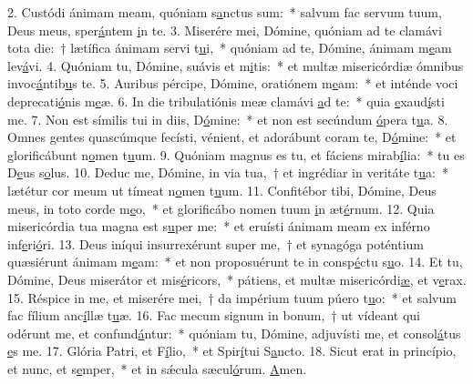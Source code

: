 2. Custódi ánimam meam, quóniam s\uline{a}nctus sum:~* salvum fac servum tuum, Deus meus, sper\uline{á}ntem \uline{i}n te.
3. Miserére mei, Dómine, quóniam ad te clamávi tota die:~† lætífica ánimam servi t\uline{u}i,~* quóniam ad te, Dómine, ánimam m\uline{e}am lev\uline{á}vi.
4. Quóniam tu, Dómine, suávis et m\uline{i}tis:~* et multæ misericórdiæ ómnibus invoc\uline{á}ntib\uline{u}s te.
5. Auribus pércipe, Dómine, oratiónem m\uline{e}am:~* et inténde voci deprecati\uline{ó}nis m\uline{e}æ.
6. In die tribulatiónis meæ clamávi \uline{a}d te:~* quia \uline{e}xaud\uline{í}sti me.
7. Non est símilis tui in diis, D\uline{ó}mine:~* et non est secúndum \uline{ó}pera t\uline{u}a.
8. Omnes gentes quascúmque fecísti, vénient, et adorábunt coram te, D\uline{ó}mine:~* et glorificábunt n\uline{o}men t\uline{u}um.
9. Quóniam magnus es tu, et fáciens mirab\uline{í}lia:~* tu es D\uline{e}us s\uline{o}lus.
10. Deduc me, Dómine, in via tua,~† et ingrédiar in veritáte t\uline{u}a:~* lætétur cor meum ut tímeat n\uline{o}men t\uline{u}um.
11. Confitébor tibi, Dómine, Deus meus, in toto corde m\uline{e}o,~* et glorificábo nomen tuum \uline{i}n æt\uline{é}rnum.
12. Quia misericórdia tua magna est s\uline{u}per me:~* et eruísti ánimam meam ex inférno inf\uline{e}ri\uline{ó}ri.
13. Deus iníqui insurrexérunt super me,~† et synagóga poténtium quæsiérunt ánimam m\uline{e}am:~* et non proposuérunt te in consp\uline{é}ctu s\uline{u}o.
14. Et tu, Dómine, Deus miserátor et mis\uline{é}ricors,~* pátiens, et multæ misericórdi\uline{æ}, et v\uline{e}rax.
15. Réspice in me, et miserére mei,~† da impérium tuum púero t\uline{u}o:~* et salvum fac fílium anc\uline{í}llæ t\uline{u}æ.
16. Fac mecum signum in bonum,~† ut vídeant qui odérunt me, et confund\uline{á}ntur:~* quóniam tu, Dómine, adjuvísti me, et consol\uline{á}tus \uline{e}s me.
17. Glória Patri, et F\uline{í}lio,~* et Spir\uline{í}tui S\uline{a}ncto.
18. Sicut erat in princípio, et nunc, et s\uline{e}mper,~* et in sǽcula sæcul\uline{ó}rum. \uline{A}men.
